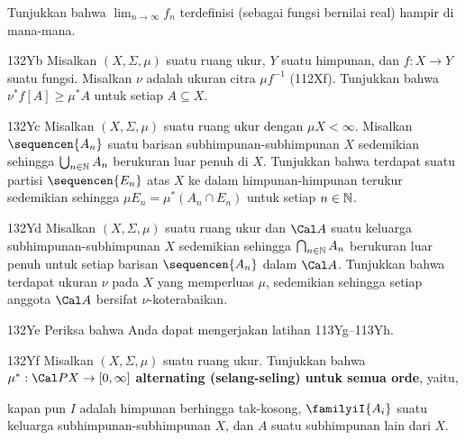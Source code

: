 {

\noindent Tunjukkan bahwa $\lim_{n\to\infty}f_n$ terdefinisi (sebagai fungsi
bernilai real) hampir di mana-mana.

\spheader 132Yb Misalkan $(X,\Sigma,\mu)$ suatu ruang ukur, $Y$ suatu
himpunan, dan $f:X\to Y$ suatu fungsi. Misalkan $\nu$ adalah ukuran citra
$\mu f^{-1}$ (112Xf). Tunjukkan bahwa $\nu^*f[A]\ge\mu^*A$ untuk setiap
$A\subseteq X$.

\spheader 132Yc Misalkan $(X,\Sigma,\mu)$ suatu ruang ukur dengan
$\mu X<\infty$. Misalkan $\sequencen{A_n}$ suatu barisan subhimpunan-subhimpunan
$X$ sedemikian sehingga $\bigcup_{n\in\Bbb N}A_n$ berukuran luar penuh di
$X$. Tunjukkan bahwa terdapat suatu partisi $\sequencen{E_n}$ atas $X$ ke
dalam himpunan-himpunan terukur sedemikian sehingga
$\mu E_n=\mu^*(A_n\cap E_n)$ untuk setiap $n\in\Bbb N$.

\spheader 132Yd Misalkan $(X,\Sigma,\mu)$ suatu ruang ukur dan $\Cal A$ suatu
keluarga subhimpunan-subhimpunan $X$ sedemikian sehingga
$\bigcap_{n\in\Bbb N}A_n$ berukuran luar penuh untuk setiap barisan
$\sequencen{A_n}$ dalam $\Cal A$. Tunjukkan bahwa terdapat ukuran $\nu$ pada
$X$ yang memperluas $\mu$, sedemikian sehingga setiap anggota $\Cal A$
bersifat $\nu$-koterabaikan.

\spheader 132Ye Periksa bahwa Anda dapat mengerjakan latihan 113Yg–113Yh.

\spheader 132Yf Misalkan $(X,\Sigma,\mu)$ suatu ruang ukur.
Tunjukkan bahwa $\mu^*: \Cal PX\to[0,\infty]$ {\bf alternating
(selang-seling) untuk semua orde}, yaitu,


\noindent kapan pun $I$ adalah himpunan berhingga tak-kosong,
$\familyiI{A_i}$ suatu keluarga subhimpunan-subhimpunan $X$, dan $A$ suatu
subhimpunan lain dari $X$.

}%

